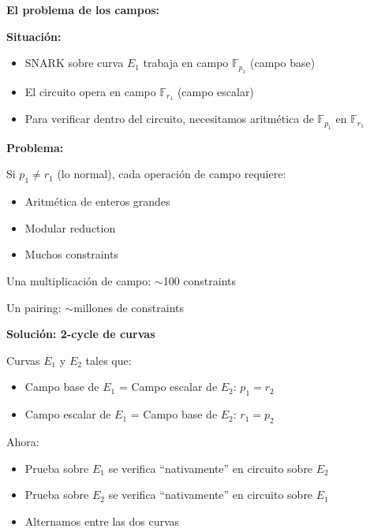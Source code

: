 \documentclass[11pt,a4paper,twoside]{book}
\newcommand{\F}{\mathbb{F}}
\begin{document}
\begin{mathnote}
\textbf{El problema de los campos:}

\textbf{Situaci\'on:}
\begin{itemize}
    \item SNARK sobre curva $E_1$ trabaja en campo $\F_{p_1}$ (campo base)
    \item El circuito opera en campo $\F_{r_1}$ (campo escalar)
    \item Para verificar dentro del circuito, necesitamos aritm\'etica de $\F_{p_1}$ en $\F_{r_1}$
\end{itemize}

\textbf{Problema:}

Si $p_1 \neq r_1$ (lo normal), cada operaci\'on de campo requiere:
\begin{itemize}
    \item Aritm\'etica de enteros grandes
    \item Modular reduction
    \item Muchos constraints
\end{itemize}

Una multiplicaci\'on de campo: $\sim$100 constraints

Un pairing: $\sim$millones de constraints

\textbf{Soluci\'on: 2-cycle de curvas}

Curvas $E_1$ y $E_2$ tales que:
\begin{itemize}
    \item Campo base de $E_1$ = Campo escalar de $E_2$: $p_1 = r_2$
    \item Campo escalar de $E_1$ = Campo base de $E_2$: $r_1 = p_2$
\end{itemize}

Ahora:
\begin{itemize}
    \item Prueba sobre $E_1$ se verifica ``nativamente'' en circuito sobre $E_2$
    \item Prueba sobre $E_2$ se verifica ``nativamente'' en circuito sobre $E_1$
    \item Alternamos entre las dos curvas
\end{itemize}
\end{mathnote}
\end{document}
